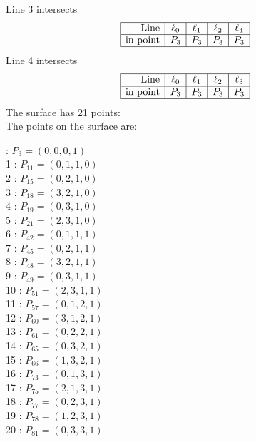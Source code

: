 \documentclass{article}
\begin{document}
{$$$$
Line 3 intersects 
$$
\begin{array}{|r*{4}{|c}|}
\hline
\mbox{Line}  & \ell_{0} & \ell_{1} & \ell_{2} & \ell_{4}\\
\hline
\mbox{in point}  & P_{3} & P_{3} & P_{3} & P_{3}\\
\hline
\end{array}
$$
Line 4 intersects 
$$
\begin{array}{|r*{4}{|c}|}
\hline
\mbox{Line}  & \ell_{0} & \ell_{1} & \ell_{2} & \ell_{3}\\
\hline
\mbox{in point}  & P_{3} & P_{3} & P_{3} & P_{3}\\
\hline
\end{array}
$$
The surface has 21 points:\\
The points on the surface are:\\
\begin{multicols}{3}
 : $P_{3}=( 0, 0, 0, 1 )$\\
1 : $P_{11}=( 0, 1, 1, 0 )$\\
2 : $P_{15}=( 0, 2, 1, 0 )$\\
3 : $P_{18}=( 3, 2, 1, 0 )$\\
4 : $P_{19}=( 0, 3, 1, 0 )$\\
5 : $P_{21}=( 2, 3, 1, 0 )$\\
6 : $P_{42}=( 0, 1, 1, 1 )$\\
7 : $P_{45}=( 0, 2, 1, 1 )$\\
8 : $P_{48}=( 3, 2, 1, 1 )$\\
9 : $P_{49}=( 0, 3, 1, 1 )$\\
10 : $P_{51}=( 2, 3, 1, 1 )$\\
11 : $P_{57}=( 0, 1, 2, 1 )$\\
12 : $P_{60}=( 3, 1, 2, 1 )$\\
13 : $P_{61}=( 0, 2, 2, 1 )$\\
14 : $P_{65}=( 0, 3, 2, 1 )$\\
15 : $P_{66}=( 1, 3, 2, 1 )$\\
16 : $P_{73}=( 0, 1, 3, 1 )$\\
17 : $P_{75}=( 2, 1, 3, 1 )$\\
18 : $P_{77}=( 0, 2, 3, 1 )$\\
19 : $P_{78}=( 1, 2, 3, 1 )$\\
20 : $P_{81}=( 0, 3, 3, 1 )$\\
\end{multicols}


%


%


}%
\end{document}
